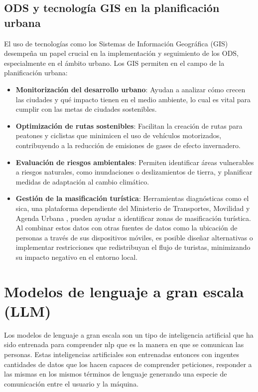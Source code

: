 	\subsection{ODS y tecnología GIS en la planificación urbana}
	El uso de tecnologías como los Sistemas de Información Geográfica (GIS) desempeña un papel crucial en la implementación y seguimiento de los ODS, especialmente en el ámbito urbano. Los GIS permiten en el campo de la planificación urbana:
	\begin{itemize}
		\item \textbf{Monitorización del desarrollo urbano}: Ayudan a analizar cómo crecen las ciudades y qué impacto tienen en el medio ambiente, lo cual es vital para cumplir con las metas de ciudades sostenibles.
		
		\item \textbf{Optimización de rutas sostenibles}: Facilitan la creación de rutas para peatones y ciclistas que minimicen el uso de vehículos motorizados, contribuyendo a la reducción de emisiones de gases de efecto invernadero.
		
		\item \textbf{Evaluación de riesgos ambientales}: Permiten identificar áreas vulnerables a riesgos naturales, como inundaciones o deslizamientos de tierra, y planificar medidas de adaptación al cambio climático.
		
		\item \textbf{Gestión de la masificación turística}: Herramientas diagnósticas como el \acrfull{sica}, una plataforma dependiente del Ministerio de Transportes, Movilidad y Agenda Urbana \cite{sica_mapa_ruido}, pueden ayudar a identificar zonas de masificación turística. Al combinar estos datos con otras fuentes de datos como la ubicación de personas a través de sus dispositivos móviles, es posible diseñar alternativas o implementar restricciones que redistribuyan el flujo de turistas, minimizando su impacto negativo en el entorno local.
 
		
	\end{itemize}
	

\section{Modelos de lenguaje a gran escala (LLM)}
Los modelos de lenguaje a gran escala son un tipo de inteligencia artificial que ha sido entrenada para comprender \acrfull{nlp} que es la manera en que se comunican las personas. Estas inteligencias artificiales son entrenadas entonces con ingentes cantidades de datos que los hacen capaces de comprender peticiones, responder a las mismas en los mismos términos de lenguaje generando una especie de comunicación entre el usuario y la máquina.

